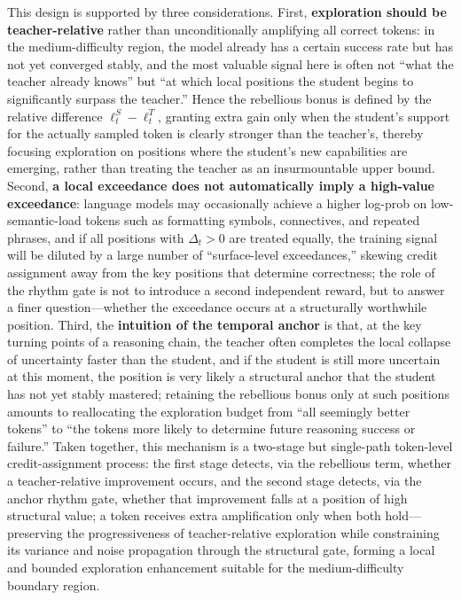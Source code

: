 \documentclass{article}
\begin{document}
This design is supported by three considerations. First, \textbf{exploration should be teacher-relative} rather than unconditionally amplifying all correct tokens: in the medium-difficulty region, the model already has a certain success rate but has not yet converged stably, and the most valuable signal here is often not ``what the teacher already knows'' but ``at which local positions the student begins to significantly surpass the teacher.'' Hence the rebellious bonus is defined by the relative difference $\ell_t^S-\ell_t^T$, granting extra gain only when the student's support for the actually sampled token is clearly stronger than the teacher's, thereby focusing exploration on positions where the student's new capabilities are emerging, rather than treating the teacher as an insurmountable upper bound. Second, \textbf{a local exceedance does not automatically imply a high-value exceedance}: language models may occasionally achieve a higher log-prob on low-semantic-load tokens such as formatting symbols, connectives, and repeated phrases, and if all positions with $\Delta_t>0$ are treated equally, the training signal will be diluted by a large number of ``surface-level exceedances,'' skewing credit assignment away from the key positions that determine correctness; the role of the rhythm gate is not to introduce a second independent reward, but to answer a finer question---whether the exceedance occurs at a structurally worthwhile position. Third, the \textbf{intuition of the temporal anchor} is that, at the key turning points of a reasoning chain, the teacher often completes the local collapse of uncertainty faster than the student, and if the student is still more uncertain at this moment, the position is very likely a structural anchor that the student has not yet stably mastered; retaining the rebellious bonus only at such positions amounts to reallocating the exploration budget from ``all seemingly better tokens'' to ``the tokens more likely to determine future reasoning success or failure.'' Taken together, this mechanism is a two-stage but single-path token-level credit-assignment process: the first stage detects, via the rebellious term, whether a teacher-relative improvement occurs, and the second stage detects, via the anchor rhythm gate, whether that improvement falls at a position of high structural value; a token receives extra amplification only when both hold---preserving the progressiveness of teacher-relative exploration while constraining its variance and noise propagation through the structural gate, forming a local and bounded exploration enhancement suitable for the medium-difficulty boundary region.
\end{document}

